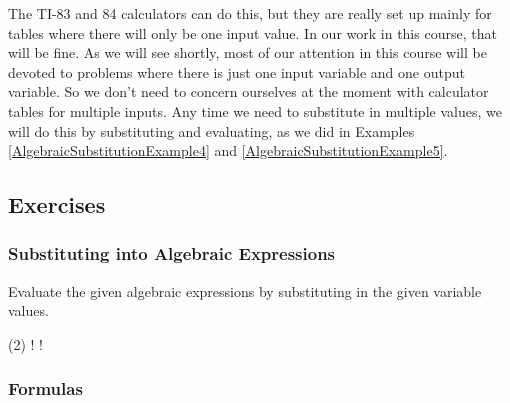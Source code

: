 The TI-83 and 84 calculators can do this, but they are really set up mainly for tables where there will only be one input value. In our work in this course, that will be fine. As we will see shortly, most of our attention in this course will be devoted to problems where there is just one input variable and one output variable. So we don’t need to concern ourselves at the moment with calculator tables for multiple inputs. Any time we need to substitute in multiple values, we will do this by substituting
and evaluating, as we did in Examples \ref{AlgebraicSubstitutionExample4} and \ref{AlgebraicSubstitutionExample5}.

%
%

\clearpage

\subsection{Exercises}

\subsubsection*{Substituting into Algebraic Expressions}

Evaluate the given algebraic expressions by substituting in the given variable values.

\begin{tasks}[label={}](2)
	\task {} 	
	\task {}
	\task {} 
	\task {}
	\task {} 
	\task {}
	\task {} 
	\task {}
	\task {} 
	\task {}
	\task!  
	\task! 
\end{tasks}	


%
%

\subsubsection*{Formulas}

